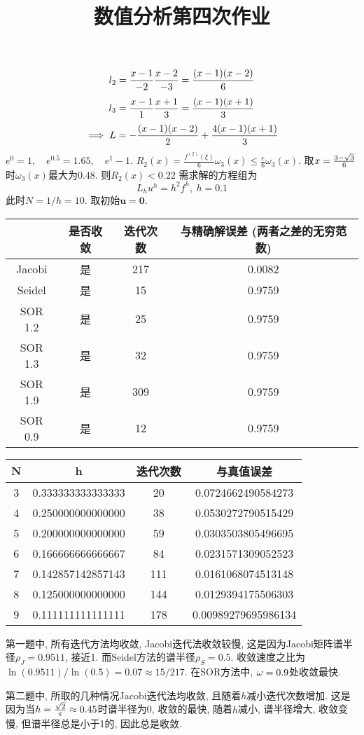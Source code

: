 \documentclass[UTF8,9pt]{ctexart}
\title{数值分析第四次作业}
\begin{document}
 
\maketitle
{}
$$l_2=\frac{x-1}{-2}\frac{x-2}{-3}=\frac{(x-1)(x-2)}{6}$$
$$l_3=\frac{x-1}{1}\frac{x+1}{3}=\frac{(x-1)(x+1)}{3}$$
$$\implies L = -\frac{(x-1)(x-2)}{2}+\frac{4(x-1)(x+1)}{3}$$
$e^0=1,\quad e^{0.5}=1.65, \quad e^1-1$. $R_2(x)=\frac{f^{(2)}(\xi)}{6} \omega_{3}(x)\leq \frac{e}{6} \omega_{3}(x)$. 取$x=\frac{3-\sqrt{3}}{6}$时$\omega_{3}(x)$最大为$0.48$. 则$R_2(x)<0.22$
\newpage
{}
需求解的方程组为
$$ 
L_{h} u^{h}=h^{2} f^{h},\ h=0.1
 $$
此时$N=1/h=10$. 取初始$\bm{u}=\bm{0}$.
\begin{center}
       \begin{tabular}{c|ccc}
               & 是否收敛 & 迭代次数 & 与精确解误差 (两者之差的无穷范数) \\
               \hline
       Jacobi  & 是    & 217  & 0.0082                \\
       Seidel  & 是    & 15   & 0.9759             \\
       SOR 1.2 & 是    & 25   & 0.9759             \\
       SOR 1.3 & 是    & 32   & 0.9759             \\
       SOR 1.9 & 是    & 309  & 0.9759             \\
       SOR 0.9 & 是    & 12   & 0.9759            
       \end{tabular}
\end{center}
\begin{center}
        \begin{tabular}{c|c|c|c}
                N & h                 & 迭代次数 & 与真值误差               \\
                \hline
                3 & 0.333333333333333 & 20   & 0.0724662490584273  \\
                4 & 0.250000000000000 & 38   & 0.0530272790515429  \\
                5 & 0.200000000000000 & 59   & 0.0303503805496695  \\
                6 & 0.166666666666667 & 84   & 0.0231571309052523  \\
                7 & 0.142857142857143 & 111  & 0.0161068074513148  \\
                8 & 0.125000000000000 & 144  & 0.0129394175506303  \\
                9 & 0.111111111111111 & 178  & 0.00989279695986134
                \end{tabular}
\end{center}
第一题中, 所有迭代方法均收敛, Jacobi迭代法收敛较慢, 这是因为Jacobi矩阵谱半径$\rho_J=0.9511$, 接近1. 而Seidel方法的谱半径$\rho_S=0.5$. 收敛速度之比为$\ln(0.9511)/\ln(0.5)=0.07 \approx 15/217$. 在SOR方法中, $\omega=0.9$处收敛最快.

第二题中, 所取的几种情况Jacobi迭代法均收敛, 且随着$h$减小迭代次数增加. 这是因为当$h=\frac{\sqrt{2}}{\pi}\approx 0.45$时谱半径为0, 收敛的最快, 随着$h$减小, 谱半径增大, 收敛变慢, 但谱半径总是小于1的, 因此总是收敛. 
\end{document}

